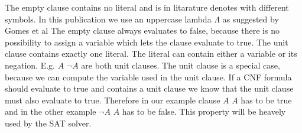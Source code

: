 The empty clause contains no literal and is in litarature denotes with different symbols. In this publication we use an uppercase lambda $\Lambda$ as suggested by Gomes et al \cite{Gomes2008SatisfiabilityS}
The empty clause always evaluates to false, because there is no possibility to assign a variable which lets the clause evaluate to true.
The unit clause contains exactly one literal. The literal can contain either a variable or its negation. E.g. $A$ $\lnot A$ are both unit clauses. The unit clause is a special case, because we can compute the variable used in the unit clause. If a CNF formula should evaluate to true and contains a unit clause we know that the unit clause must also evaluate to true. Therefore in our example clause  $A$ $A$ has to be true and in the other example $\lnot A$ $A$ has to be false. This property will be heavely used by the SAT solver.
